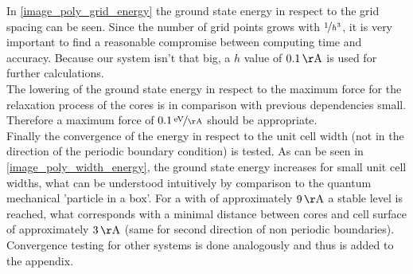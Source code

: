 In \cref{image_poly_grid_energy} the ground state energy in respect to the grid spacing can be seen. Since the number of grid points grows with $\nicefrac{1}{h^3}$, it is very important to find a reasonable compromise between computing time and accuracy. Because our system isn't that big, a $h$ value of $\unit[0.1]{\AA}$ is used for further calculations.\\
The lowering of the ground state energy in respect to the maximum force for the relaxation process of the cores is in comparison with previous dependencies small. Therefore a maximum force of $\unitfrac[0.1]{eV}{\AA}$ should be appropriate.\\
Finally the convergence of the energy in respect to the unit cell width (not in the direction of the periodic boundary condition) is tested. As can be seen in \cref{image_poly_width_energy}, the ground state energy increases for small unit cell widths, what can be understood intuitively by comparison to the quantum mechanical 'particle in a box'. For a with of approximately $\unit[9]{\AA}$ a stable level is reached, what corresponds with a minimal distance between cores and cell surface of approximately $\unit[3]{\AA}$ (same for second direction of non periodic boundaries).\\
Convergence testing for other systems is done analogously and thus is added to the appendix.

